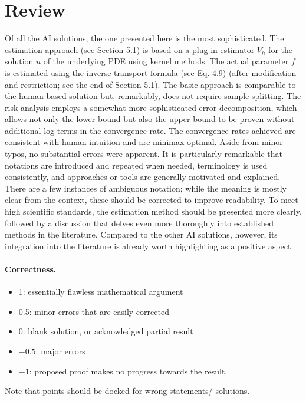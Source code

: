 \documentclass[11pt]{article}
\numberwithin{equation}{section}
\begin{document}
\maketitle

\section{Review}
Of all the AI solutions, the one presented here is the most sophisticated. The estimation approach (see Section 5.1) is based on a plug-in estimator $V_h$ for the solution $u$ of the underlying PDE using kernel methods. The actual parameter $f$ is estimated using the inverse transport formula (see Eq. 4.9) (after modification and restriction; see the end of Section 5.1). The basic approach is comparable to the human-based solution but, remarkably, does not require sample splitting. The risk analysis employs a somewhat more sophisticated error decomposition, which allows not only the lower bound but also the upper bound to be proven without additional log terms in the convergence rate. The convergence rates achieved are consistent with human intuition and are minimax-optimal. Aside from minor typos, no substantial errors were apparent. It is particularly remarkable that notations are introduced and repeated when needed, terminology is used consistently, and approaches or tools are generally motivated and explained.
There are a few instances of ambiguous notation; while the meaning is mostly clear from the context, these should be corrected to improve readability. To meet high scientific standards, the estimation method should be presented more clearly, followed by a discussion that delves even more thoroughly into established methods in the literature. Compared to the other AI solutions, however, its integration into the literature is already worth highlighting as a positive aspect.


\paragraph{Correctness.}
\begin{itemize}
	\item  1: essentially flawless mathematical argument
	\item  0.5: minor errors that are easily corrected
	\item  0: blank solution, or acknowledged partial result
	\item  $-0.5$: major errors
	\item  $-1$: proposed proof makes no progress towards the result.
\end{itemize}
Note that points should be docked for wrong statements/ solutions.
\end{document}
